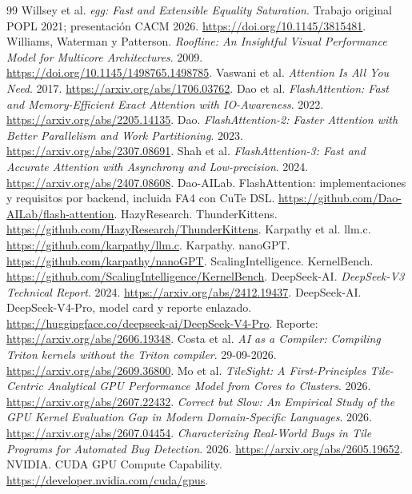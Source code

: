 \documentclass[12pt,a4paper,oneside]{report}
\begin{document}
\begin{thebibliography}{99}
 Willsey et al. \emph{egg: Fast and Extensible Equality Saturation}. Trabajo original POPL 2021; presentación CACM 2026. \url{https://doi.org/10.1145/3815481}.
 Williams, Waterman y Patterson. \emph{Roofline: An Insightful Visual Performance Model for Multicore Architectures}. 2009. \url{https://doi.org/10.1145/1498765.1498785}.
 Vaswani et al. \emph{Attention Is All You Need}. 2017. \url{https://arxiv.org/abs/1706.03762}.
 Dao et al. \emph{FlashAttention: Fast and Memory-Efficient Exact Attention with IO-Awareness}. 2022. \url{https://arxiv.org/abs/2205.14135}.
 Dao. \emph{FlashAttention-2: Faster Attention with Better Parallelism and Work Partitioning}. 2023. \url{https://arxiv.org/abs/2307.08691}.
 Shah et al. \emph{FlashAttention-3: Fast and Accurate Attention with Asynchrony and Low-precision}. 2024. \url{https://arxiv.org/abs/2407.08608}.
 Dao-AILab. FlashAttention: implementaciones y requisitos por backend, incluida FA4 con CuTe DSL. \url{https://github.com/Dao-AILab/flash-attention}.
 HazyResearch. ThunderKittens. \url{https://github.com/HazyResearch/ThunderKittens}.
 Karpathy et al. llm.c. \url{https://github.com/karpathy/llm.c}.
 Karpathy. nanoGPT. \url{https://github.com/karpathy/nanoGPT}.
 ScalingIntelligence. KernelBench. \url{https://github.com/ScalingIntelligence/KernelBench}.
 DeepSeek-AI. \emph{DeepSeek-V3 Technical Report}. 2024. \url{https://arxiv.org/abs/2412.19437}.
 DeepSeek-AI. DeepSeek-V4-Pro, model card y reporte enlazado. \url{https://huggingface.co/deepseek-ai/DeepSeek-V4-Pro}. Reporte: \url{https://arxiv.org/abs/2606.19348}.
 Costa et al. \emph{AI as a Compiler: Compiling Triton kernels without the Triton compiler}. 29-09-2026. \url{https://arxiv.org/abs/2609.36800}.
 Mo et al. \emph{TileSight: A First-Principles Tile-Centric Analytical GPU Performance Model from Cores to Clusters}. 2026. \url{https://arxiv.org/abs/2607.22432}.
 \emph{Correct but Slow: An Empirical Study of the GPU Kernel Evaluation Gap in Modern Domain-Specific Languages}. 2026. \url{https://arxiv.org/abs/2607.04454}.
 \emph{Characterizing Real-World Bugs in Tile Programs for Automated Bug Detection}. 2026. \url{https://arxiv.org/abs/2605.19652}.
 NVIDIA. CUDA GPU Compute Capability. \url{https://developer.nvidia.com/cuda/gpus}.


\end{thebibliography}
\end{document}
